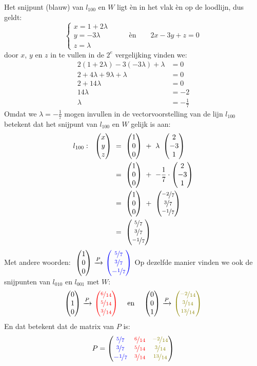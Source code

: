 Het snijpunt (blauw) van $l_{100}$ en $W$ ligt èn in het vlak èn op de loodlijn, dus geldt:
\[
    \begin{cases}
        x = 1 + 2\lambda  \\
        y = -3\lambda   \qquad \qquad \text{èn} \qquad  2x-3y+z = 0 \\
        z = \lambda 
    \end{cases}
\] 
door $x$, $y$ en $z$ in te vullen in de $2^e$ vergelijking vinden we:
\begin{align*}
    2(1 + 2\lambda) - 3 (-3\lambda) + \lambda &= 0 \\
    2 + 4\lambda +9\lambda + \lambda &= 0 \\
    2+ 14\lambda  &= 0 \\
    14\lambda  &= -2 \\
    \lambda &= -\frac{1}{7}    
\end{align*}
Omdat we $\lambda = -\frac{1}{7}$ mogen invullen in  de vectorvoorstelling van de lijn $l_{100}$ betekent dat het snijpunt van $l_{100}$ en $W$ gelijk is aan:
\begin{align*}
    l_{100}: \ \ \matdrie{x}{y}{z} \ &= \ \matdrie{1}{0}{0}  \ + \ \lambda \ \matdrie{2}{-3}{1}  \\
       &= \ \matdrie{1}{0}{0} \ + \ -\frac{1}{7} \cdot \matdrie{2}{-3}{1} \\
       &= \ \matdrie{1}{0}{0} \ + \ \matdrie{\nicefrac{-2}{7}}{\nicefrac{3}{7}}{\nicefrac{-1}{7}} \\
       &= \ \matdrie{\nicefrac{5}{7}}{\nicefrac{3}{7}}{\nicefrac{-1}{7}}
\end{align*}
Met andere woorden: $\ \vecdrie{1}{0}{0} \ \xrightarrow{P}\ \vecdrie[blue]{\nicefrac{5}{7} }{\nicefrac{3}{7} }{-\nicefrac{1}{7} } $
Op dezelfde manier vinden we ook de snijpunten van $l_{010}$ en $l_{001}$ met $W$: 
\[
    \vecdrie{0}{1}{0} \ \xrightarrow{P}\ \vecdrie[red]{\nicefrac{6}{14} }{\nicefrac{5}{14} }{\nicefrac{3}{14} } \quad \text{ en } \quad
    \vecdrie{0}{0}{1} \ \xrightarrow{P}\ \vecdrie[olive]{\nicefrac{-2}{14} }{\nicefrac{3}{14} }{\nicefrac{13}{14}}
\] 
En dat betekent dat de matrix van $P$ is:
\[
    P = \matdrie{ \blu{\nicefrac{5}{7}}  & \red{\nicefrac{6}{14}} & \gre{\nicefrac{-2}{14}}}
                { \blu{\nicefrac{3}{7}}  & \red{\nicefrac{5}{14}} & \gre{\nicefrac{3}{14}}}
                { \blu{-\nicefrac{1}{7}} & \red{\nicefrac{3}{14}} & \gre{\nicefrac{13}{14}}}
\]

